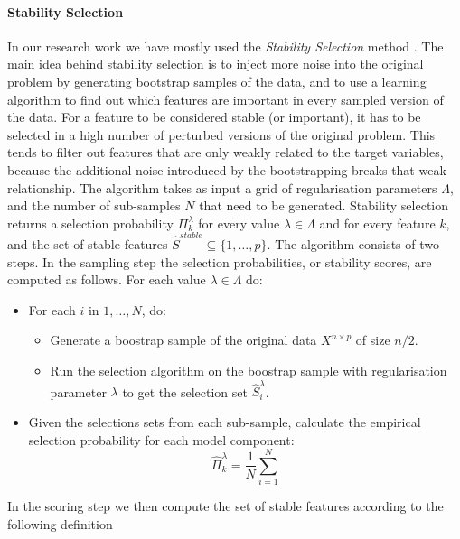 \paragraph{Stability Selection} \label{Stability Selection}

In our research work we have mostly used the \textit{Stability Selection} method \citep{meinshausen2010stability}.  The main idea behind stability selection is to inject more noise into the original problem by generating bootstrap samples of the data, and to use a learning algorithm to find out which features are important in every sampled version of the data. For a feature to be considered stable (or important), it has to be selected in a high number of perturbed versions of the original problem. This tends to filter out features that are only weakly related to the target variables, because the additional noise introduced by the bootstrapping breaks that weak relationship. The algorithm takes as input a grid of regularisation parameters $\Lambda$, and the number of sub-samples $N$ that need to be generated. Stability selection returns a selection probability $\Pi^{\lambda}_{k}$ for every value $\lambda \in \Lambda$ and for every feature $k$, and the set of stable features $\hat{S}^{stable}\subseteq\{1,…,p\}$. The algorithm consists of two steps. In the sampling step the selection probabilities, or stability scores, are computed as follows. For each value $\lambda \in \Lambda$ do:

\begin{itemize}
    \item For each $i$ in $1,\dots, N$, do:
    \begin{itemize}
        \item Generate a boostrap sample of the original data $X^{n\times p}$ of size $n/2$.
        \item Run the selection algorithm on the boostrap sample with regularisation parameter $\lambda$ to get the selection set $\hat{S}^{\lambda}_{i}$.
    \end{itemize}
    \item Given the selections sets from each sub-sample, calculate the empirical selection probability for each model component:
    \begin{equation}
        \hat{\Pi}^{\lambda}_{k} = \frac{1}{N}\sum_{i=1}^{N}
    \end{equation}
\end{itemize}

In the scoring step we then compute the set of stable features according to the following definition


